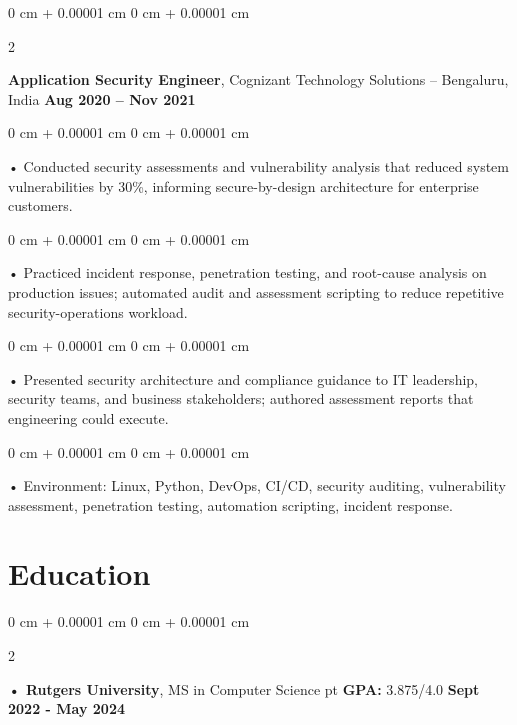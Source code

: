 \documentclass[10pt, letterpaper]{article}
\newenvironment{onecolentry}{
    \begin{adjustwidth}{
        0 cm + 0.00001 cm
    }{
        0 cm + 0.00001 cm
    }
}{
    \end{adjustwidth}
} %
\newenvironment{twocolentry}[2][]{
    \onecolentry
    \def\secondColumn{#2}
    \setcolumnwidth{\fill, 4.5 cm}
    \begin{paracol}{2}
}{
    \switchcolumn \raggedleft \secondColumn
    \end{paracol}
    \endonecolentry
} %
\begin{document}
        \begin{twocolentry}{
            \textbf{Aug 2020 – Nov 2021}
        }
            \vspace{2 pt }
            \textbf{Application Security Engineer}, Cognizant Technology Solutions -- Bengaluru, India\end{twocolentry}
        \begin{onecolentry}
             • Conducted security assessments and vulnerability analysis that reduced system vulnerabilities by 30\%, informing secure-by-design architecture for enterprise customers.
        \end{onecolentry}
        \begin{onecolentry}
             • Practiced incident response, penetration testing, and root-cause analysis on production issues; automated audit and assessment scripting to reduce repetitive security-operations workload.
        \end{onecolentry}
        \begin{onecolentry}
             • Presented security architecture and compliance guidance to IT leadership, security teams, and business stakeholders; authored assessment reports that engineering could execute.
        \end{onecolentry}

        \begin{onecolentry}
             • Environment: Linux, Python, DevOps, CI/CD, security auditing, vulnerability assessment, penetration testing, automation scripting, incident response.
        \end{onecolentry}
    \vspace{2 pt }
        \section{Education}
        \vspace{2 pt }
        \begin{twocolentry}{
            \textbf{Sept 2022 - May 2024}
        }
            \textbf{ • Rutgers University}, MS in Computer Science  pt \textbf{GPA:} 3.875/4.0  \end{twocolentry}
\end{document}
